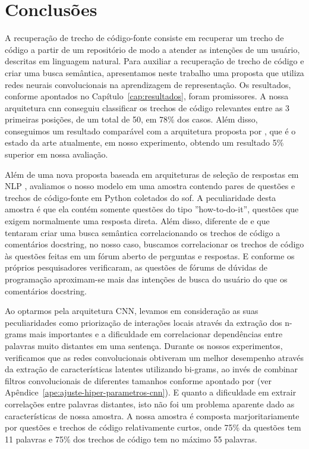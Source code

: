 \chapter{Conclusões}
\label{cap:conclusoes}


A recuperação de trecho de código-fonte consiste em recuperar um trecho de código a partir de um repositório de modo a atender as intenções de um usuário, descritas em linguagem natural. Para auxiliar a recuperação de trecho de código e criar uma busca semântica, apresentamos neste trabalho uma proposta que utiliza redes neurais convolucionais na aprendizagem de representação. Os resultados, conforme apontados no Capítulo~\ref{cap:resultados}, foram promissores. A nossa arquitetura \acrshort{cnn} conseguiu classificar os trechos de código relevantes entre as 3 primeiras posições, de um total de 50, em 78\% dos casos. Além disso, conseguimos um resultado comparável com a arquitetura proposta por \cite{cambronero-deep-learning-code-search:2019}, que é o estado da arte atualmente, em nosso experimento, obtendo um resultado 5\% superior em nossa avaliação.

Além de uma nova proposta baseada em arquiteturas de seleção de respostas em NLP \citep{feng-2015, tan-lstm-qa}, avaliamos o nosso modelo em uma amostra contendo pares de questões e trechos de código-fonte em Python coletados do \Gls{sof}. A peculiaridade desta amostra é que ela contém somente questões do tipo ''how-to-do-it'', questões que exigem normalmente uma resposta direta. Além disso, diferente de \cite{cambronero-deep-learning-code-search:2019} e \cite{husain-github-semantic-search-code-2019} que tentaram criar uma busca semântica correlacionando os trechos de código a comentários \gls{docstring}, no nosso caso, buscamos correlacionar os trechos de código às questões feitas em um fórum aberto de perguntas e respostas. E conforme os próprios pesquisadores \cite{cambronero-deep-learning-code-search:2019, husain-github-semantic-search-code-2019} verificaram, as questões de fórums de dúvidas de programação aproximam-se mais das intenções de busca do usuário do que os comentários docstring. 

Ao optarmos pela arquitetura CNN, levamos em consideração as suas peculiaridades como priorização de interações locais através da extração dos n-grams mais importantes e a dificuldade em correlacionar dependências entre palavras muito distantes em uma sentença. Durante os nossos experimentos, verificamos que as redes convolucionais obtiveram um melhor desempenho através da extração de características latentes utilizando bi-grams, ao invés de combinar filtros convolucionais de diferentes tamanhos conforme apontado por \cite{tang-hybrid-deep-representation-2018} (ver Apêndice~\ref{ape:ajuste-hiper-parametros-cnn}). E quanto a dificuldade em extrair correlações entre palavras distantes, isto não foi um problema aparente dado as características de nossa amostra. A nossa amostra é composta marjoritariamente por questões e trechos de código relativamente curtos, onde 75\% da questões tem 11 palavras e 75\% dos trechos de código tem no máximo 55 palavras. 

